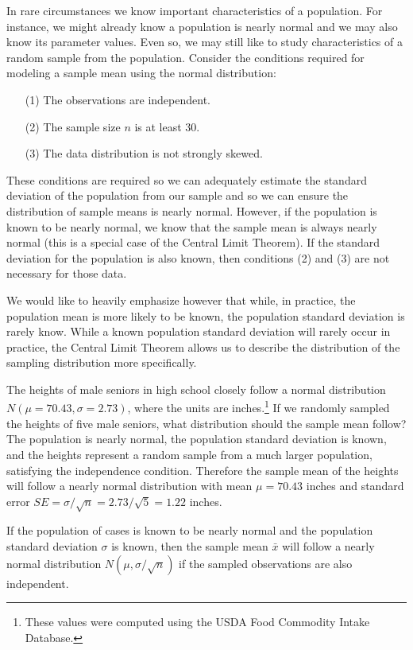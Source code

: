 In rare circumstances we know important characteristics of a population. For instance, we might already know a population is nearly normal and we may also know its parameter values. Even so, we may still like to study characteristics of a random sample from the population. Consider the conditions required for modeling a sample mean using the normal distribution:
\begin{enumerate}
\setlength{\itemsep}{0mm}
\item[(1)] The observations are independent.
\item[(2)] The sample size $n$ is at least 30.
\item[(3)] The data distribution is not strongly skewed.
\end{enumerate}
These conditions are required so we can adequately estimate the standard deviation of the population from our sample and so we can ensure the distribution of sample means is nearly normal. However, if the population is known to be nearly normal, we know that the sample mean is always nearly normal (this is a special case of the Central Limit Theorem). If the standard deviation for the population is also known, then conditions (2) and (3) are not necessary for those data. 

We would like to heavily emphasize however that while, in practice, the population mean is more likely to be known, the population standard deviation is rarely know. While a known population standard deviation will rarely occur in practice, the Central Limit Theorem allows us to describe the distribution of the sampling distribution more specifically. 

\begin{example}{The heights of male seniors in high school closely follow a normal distribution $N(\mu=70.43, \sigma=2.73)$, where the units are inches.\footnote{These values were computed using the USDA Food Commodity Intake Database.} If we randomly sampled the heights of five male seniors, what distribution should the sample mean follow?}\label{simpleSampleOfFiveMaleSeniors}
The population is nearly normal, the population standard deviation is known, and the heights represent a random sample from a much larger population, satisfying the independence condition. Therefore the sample mean of the heights will follow a nearly normal distribution with mean $\mu=70.43$ inches and standard error $SE=\sigma/\sqrt{n} = 2.73/\sqrt{5}=1.22$ inches.
\end{example}

\begin{termBox}{
If the population of cases is known to be nearly normal and the population standard deviation $\sigma$ is known, then the sample mean $\bar{x}$ will follow a nearly normal distribution $N(\mu, \sigma/\sqrt{n})$ if the sampled observations are also independent.}
\end{termBox}


